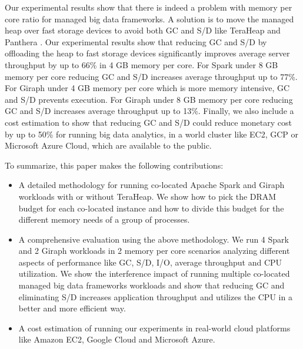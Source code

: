 Our experimental results show that there is indeed a problem with memory per core ratio
for managed big data frameworks.
A solution is to move the managed heap over fast storage devices to avoid both GC and S/D like TeraHeap and Panthera \cite{Panthera}.
Our experimental results show that reducing GC and S/D by offloading the heap to fast storage devices significantly
improves average server throughput by up to 66\% in 4 GB memory per core. 
For Spark under 8 GB memory per core reducing GC and S/D increases average throughput up to 77\%.
For Giraph under 4 GB memory per core which is more memory intensive, GC and S/D prevents execution.
For Giraph under 8 GB memory per core reducing GC and S/D increases average throughput up to 13\%.
Finally, we also include a cost estimation to show that reducing GC and S/D could reduce monetary cost by up to 50\% for running big data
analytics, in a world cluster like EC2, GCP or Microsoft Azure Cloud, which are available to
the public.

To summarize, this paper makes the following contributions: 
\begin{itemize}
    \item{A detailed methodology for running co-located Apache Spark and Giraph
        workloads with or without TeraHeap. 
	We show how to pick the DRAM budget for each co-located instance and how to divide this budget
		for the different memory needs of a group of processes.
		}

    \item{A comprehensive evaluation using the above methodology.
	    We run 4 Spark and 2 Giraph workloads in 2 memory per core scenarios
	    analyzing different aspects of performance like GC, S/D, I/O, average throughput
		and CPU utilization. We show the interference impact of running multiple co-located managed big data frameworks
		workloads and show that reducing GC and eliminating S/D increases application throughput and utilizes the CPU in a better and more efficient way. }

    \item{A cost estimation of running our experiments in real-world
        cloud platforms like Amazon EC2, Google Cloud and Microsoft
        Azure.}
\end{itemize}
